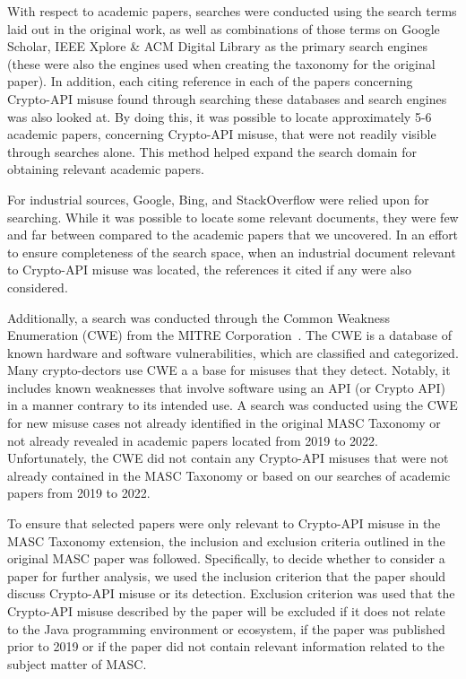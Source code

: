 With respect to academic papers, searches were conducted using the search terms laid out in the original work, as well as combinations of those terms on Google Scholar, IEEE Xplore \& ACM Digital Library as the primary search engines (these were also the engines used when creating the taxonomy for the original paper). In addition, each citing reference in each of the papers concerning Crypto-API misuse found through searching these databases and search engines was also looked at.  By doing this, it was possible to locate approximately 5-6 academic papers, concerning Crypto-API misuse, that were not readily visible through searches alone. This method helped expand the search domain for obtaining relevant academic papers.

For industrial sources, Google, Bing, and StackOverflow were relied upon for searching.  While it was possible to locate some relevant documents, they were few and far between compared to the academic papers that we uncovered.  In  an effort to ensure completeness of the search space,  when an industrial document relevant to Crypto-API misuse was located, the references it cited if any were also considered.

Additionally, a search was conducted through the Common Weakness Enumeration (CWE) from the MITRE Corporation~.  The CWE is a database of known hardware and software vulnerabilities, which are classified and categorized. Many crypto-dectors use CWE a a base for misuses that they detect.  Notably, it includes known weaknesses that involve software using an API (or Crypto API) in a manner contrary to its intended use.  A search was conducted using the CWE for new misuse cases not already identified in the original MASC Taxonomy or not already revealed in academic papers located from 2019 to 2022.  Unfortunately, the CWE did not contain any Crypto-API misuses that were not already contained in the MASC Taxonomy or based on our searches of academic papers from 2019 to 2022. 

To ensure that selected papers were only relevant to Crypto-API misuse in the MASC Taxonomy extension, the inclusion and exclusion criteria outlined in the original MASC paper was followed.  Specifically, to decide whether to consider a paper for further analysis, we used the inclusion criterion that the paper should discuss Crypto-API misuse or its detection. Exclusion criterion was used that the Crypto-API misuse described by the paper will be excluded if it does not relate to the Java programming environment or ecosystem, if the paper was published prior to 2019 or if the paper did not contain relevant information related to the subject matter of MASC.
    
